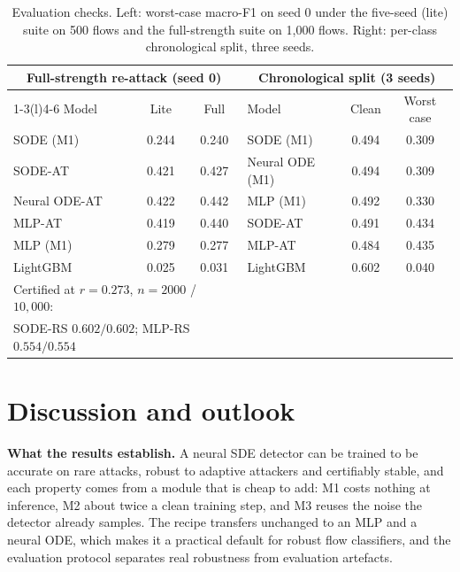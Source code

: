 \documentclass{article}
\theoremstyle{definition}
\begin{document}
\begin{table}[t]
\caption{Evaluation checks. Left: worst-case macro-F1 on seed 0 under the five-seed
(lite) suite on 500 flows and the full-strength suite on 1{,}000 flows. Right:
per-class chronological split, three seeds.}
\label{tab:checks}
\centering\small\setlength{\tabcolsep}{4pt}
\begin{tabular}{lcc@{\hspace{18pt}}lcc}
\toprule
\multicolumn{3}{c}{Full-strength re-attack (seed 0)} & \multicolumn{3}{c}{Chronological split (3 seeds)}\\
\cmidrule(r){1-3}\cmidrule(l){4-6}
Model & Lite & Full & Model & Clean & Worst case\\
\midrule
SODE (M1) & 0.244 & 0.240 & SODE (M1) & 0.494 & 0.309\\
SODE-AT & 0.421 & 0.427 & Neural ODE (M1) & 0.494 & 0.309\\
Neural ODE-AT & 0.422 & 0.442 & MLP (M1) & 0.492 & 0.330\\
MLP-AT & 0.419 & 0.440 & SODE-AT & 0.491 & 0.434\\
MLP (M1) & 0.279 & 0.277 & MLP-AT & 0.484 & 0.435\\
LightGBM & 0.025 & 0.031 & LightGBM & 0.602 & 0.040\\
\midrule
\multicolumn{3}{l}{Certified at $r=0.273$, $n=2000$ / $10{,}000$:} & & & \\
\multicolumn{3}{l}{\quad SODE-RS $0.602/0.602$; MLP-RS $0.554/0.554$} & & & \\
\bottomrule
\end{tabular}
\end{table}

\section{Discussion and outlook}\label{sec:disc}
\textbf{What the results establish.} A neural SDE detector can be trained to be
accurate on rare attacks, robust to adaptive attackers and certifiably stable,
and each property comes from a module that is cheap to add: M1 costs nothing at
inference, M2 about twice a clean training step, and M3 reuses the noise the
detector already samples. The recipe transfers unchanged to an MLP and a neural
ODE, which makes it a practical default for robust flow classifiers, and the
evaluation protocol separates real robustness from evaluation artefacts.
\end{document}

